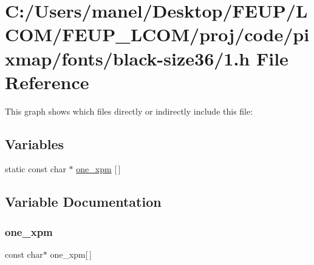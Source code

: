 \hypertarget{black-size36_21_8h}{}\section{C\+:/\+Users/manel/\+Desktop/\+F\+E\+U\+P/\+L\+C\+O\+M/\+F\+E\+U\+P\+\_\+\+L\+C\+O\+M/proj/code/pixmap/fonts/black-\/size36/1.h File Reference}
\label{black-size36_21_8h}
This graph shows which files directly or indirectly include this file\+:
\subsection*{Variables}
\begin{DoxyCompactItemize}
\item 
static const char $\ast$ \mbox{\hyperlink{black-size36_21_8h_a6d942619574fb4ca9cfc834b653c4bca}{one\+\_\+xpm}} \mbox{[}$\,$\mbox{]}
\end{DoxyCompactItemize}


\subsection{Variable Documentation}
\mbox{\label{black-size36_21_8h_a6d942619574fb4ca9cfc834b653c4bca}} 
\subsubsection{\texorpdfstring{one\_xpm}{one\_xpm}}
{\footnotesize\ttfamily const char$\ast$ one\+\_\+xpm\mbox{[}$\,$\mbox{]}\hspace{0.3cm}{\ttfamily [static]}}

